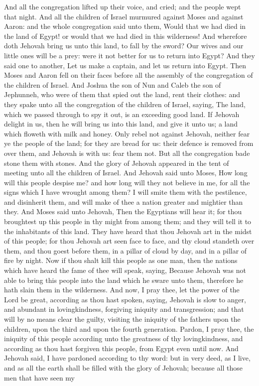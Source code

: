 And all the congregation lifted up their voice, and cried; and the people wept that night. And all the children of Israel murmured against Moses and against Aaron: and the whole congregation said unto them, Would that we had died in the land of Egypt! or would that we had died in this wilderness! And wherefore doth Jehovah bring us unto this land, to fall by the sword? Our wives and our little ones will be a prey: were it not better for us to return into Egypt?  And they said one to another, Let us make a captain, and let us return into Egypt. Then Moses and Aaron fell on their faces before all the assembly of the congregation of the children of Israel. And Joshua the son of Nun and Caleb the son of Jephunneh, who were of them that spied out the land, rent their clothes: and they spake unto all the congregation of the children of Israel, saying, The land, which we passed through to spy it out, is an exceeding good land. If Jehovah delight in us, then he will bring us into this land, and give it unto us; a land which floweth with milk and honey. Only rebel not against Jehovah, neither fear ye the people of the land; for they are bread for us: their defence is removed from over them, and Jehovah is with us: fear them not. But all the congregation bade stone them with stones. And the glory of Jehovah appeared in the tent of meeting unto all the children of Israel.  And Jehovah said unto Moses, How long will this people despise me? and how long will they not believe in me, for all the signs which I have wrought among them? I will smite them with the pestilence, and disinherit them, and will make of thee a nation greater and mightier than they.  And Moses said unto Jehovah, Then the Egyptians will hear it; for thou broughtest up this people in thy might from among them; and they will tell it to the inhabitants of this land. They have heard that thou Jehovah art in the midst of this people; for thou Jehovah art seen face to face, and thy cloud standeth over them, and thou goest before them, in a pillar of cloud by day, and in a pillar of fire by night. Now if thou shalt kill this people as one man, then the nations which have heard the fame of thee will speak, saying, Because Jehovah was not able to bring this people into the land which he sware unto them, therefore he hath slain them in the wilderness. And now, I pray thee, let the power of the Lord be great, according as thou hast spoken, saying, Jehovah is slow to anger, and abundant in lovingkindness, forgiving iniquity and transgression; and that will by no means clear the guilty, visiting the iniquity of the fathers upon the children, upon the third and upon the fourth generation. Pardon, I pray thee, the iniquity of this people according unto the greatness of thy lovingkindness, and according as thou hast forgiven this people, from Egypt even until now.  And Jehovah said, I have pardoned according to thy word: but in very deed, as I live, and as all the earth shall be filled with the glory of Jehovah; because all those men that have seen my 